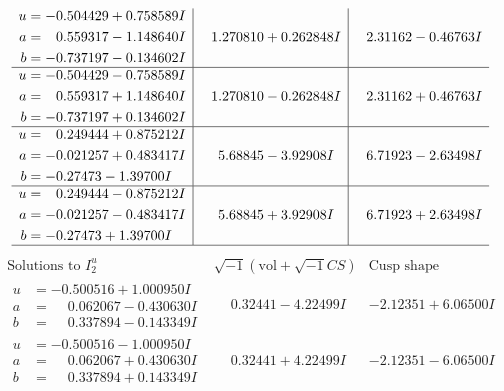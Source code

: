 \documentclass[1p]{elsarticle_modified}
\theoremstyle{definition}
\newcommand{\I}{\sqrt{-1}}
\begin{document}
$$\begin{array}{c|c|c}
\begin{aligned}
u &= -0.504429 + 0.758589 I \\
a &= \phantom{-}0.559317 - 1.148640 I \\
b &= -0.737197 - 0.134602 I\end{aligned}
 & \phantom{-}1.270810 + 0.262848 I & \phantom{-}2.31162 - 0.46763 I \\ \hline\begin{aligned}
u &= -0.504429 - 0.758589 I \\
a &= \phantom{-}0.559317 + 1.148640 I \\
b &= -0.737197 + 0.134602 I\end{aligned}
 & \phantom{-}1.270810 - 0.262848 I & \phantom{-}2.31162 + 0.46763 I \\ \hline\begin{aligned}
u &= \phantom{-}0.249444 + 0.875212 I \\
a &= -0.021257 + 0.483417 I \\
b &= -0.27473 - 1.39700 I\end{aligned}
 & \phantom{-}5.68845 - 3.92908 I & \phantom{-}6.71923 - 2.63498 I \\ \hline\begin{aligned}
u &= \phantom{-}0.249444 - 0.875212 I \\
a &= -0.021257 - 0.483417 I \\
b &= -0.27473 + 1.39700 I\end{aligned}
 & \phantom{-}5.68845 + 3.92908 I & \phantom{-}6.71923 + 2.63498 I\\
 \hline 
 \end{array}$$\newpage$$\begin{array}{c|c|c}  
\text{Solutions to }I^u_{2}& \I (\text{vol} + \sqrt{-1}CS) & \text{Cusp shape}\\
 \hline 
\begin{aligned}
u &= -0.500516 + 1.000950 I \\
a &= \phantom{-}0.062067 - 0.430630 I \\
b &= \phantom{-}0.337894 - 0.143349 I\end{aligned}
 & \phantom{-}0.32441 - 4.22499 I & -2.12351 + 6.06500 I \\ \hline\begin{aligned}
u &= -0.500516 - 1.000950 I \\
a &= \phantom{-}0.062067 + 0.430630 I \\
b &= \phantom{-}0.337894 + 0.143349 I\end{aligned}
 & \phantom{-}0.32441 + 4.22499 I & -2.12351 - 6.06500 I \\ \hline\begin{aligned}

\end{aligned}
\end{array}$$
\end{document}
